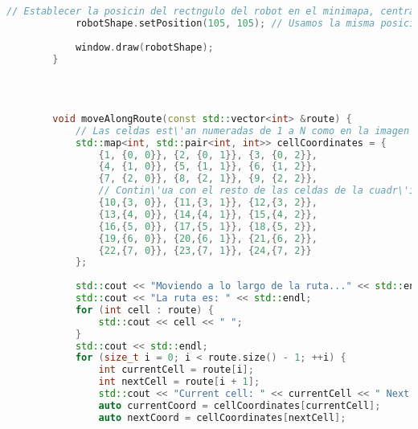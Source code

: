 \begin{lstlisting}[language={C++}, caption={Primer ajuste de c\'odigo}, label={Script}]
            // Establecer la posicin del rectngulo del robot en el minimapa, centrado en la posicin del LiDAR
            robotShape.setPosition(105, 105); // Usamos la misma posicin del LiDAR para centrar el robot
        
            window.draw(robotShape);
        }
        
        
        
        
        void moveAlongRoute(const std::vector<int> &route) {
            // Las celdas est\'an numeradas de 1 a N como en la imagen proporcionada.
            std::map<int, std::pair<int, int>> cellCoordinates = {
                {1, {0, 0}}, {2, {0, 1}}, {3, {0, 2}},
                {4, {1, 0}}, {5, {1, 1}}, {6, {1, 2}},
                {7, {2, 0}}, {8, {2, 1}}, {9, {2, 2}},
                // Contin\'ua con el resto de las celdas de la cuadr\'icula...
                {10,{3, 0}}, {11,{3, 1}}, {12,{3, 2}},
                {13,{4, 0}}, {14,{4, 1}}, {15,{4, 2}},
                {16,{5, 0}}, {17,{5, 1}}, {18,{5, 2}},
                {19,{6, 0}}, {20,{6, 1}}, {21,{6, 2}},
                {22,{7, 0}}, {23,{7, 1}}, {24,{7, 2}}
            };
        
            std::cout << "Moviendo a lo largo de la ruta..." << std::endl;
            std::cout << "La ruta es: " << std::endl;
            for (int cell : route) {
                std::cout << cell << " ";
            }
            std::cout << std::endl;
            for (size_t i = 0; i < route.size() - 1; ++i) {
                int currentCell = route[i];
                int nextCell = route[i + 1];
                std::cout << "Current cell: " << currentCell << " Next cell: " << nextCell << endl;
                auto currentCoord = cellCoordinates[currentCell];
                auto nextCoord = cellCoordinates[nextCell];
        

\end{lstlisting}
